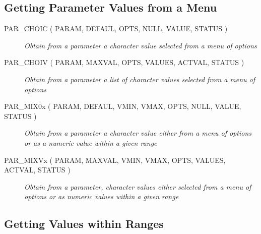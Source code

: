 \documentclass[twoside,11pt]{article}
\newcommand{\htmlref}[2]{#1}
\newcommand{\xlabel}[1]{}
\newcommand{\listline}{\hspace{1pt}\\}
\newcommand{\listova}[1]{}
\newcommand{\listovb}[1]{\textbf{#1}\\}
\renewcommand{\listline}{}
\renewcommand{\listova}[1]{#1}
\renewcommand{\listovb}[1]{}
\begin{document}
\subsection{\xlabel{getting_parameter_values_from_a_menu}Getting Parameter Values from a Menu}

\begin{description}
\item [\htmlref{PAR\_CHOIC}{PAR_CHOIC} 
( PARAM, DEFAUL, OPTS, NULL, VALUE, STATUS )] \listline
\textit{Obtain from a parameter a character value selected from a menu
            of options}
\item [\htmlref{PAR\_CHOIV}{PAR_CHOIV} 
( PARAM, MAXVAL, OPTS, VALUES, ACTVAL, STATUS )] \listline
\textit{Obtain from a parameter a list of character values selected from
            a menu of options}
\item [\htmlref{PAR\_MIX0x}{PAR_MIX0x} 
( PARAM, DEFAUL, VMIN, VMAX, OPTS, NULL, VALUE, STATUS )] \listline
\textit{Obtain from a parameter a character value either from a menu of
             options or as a numeric value within a given range}
\item [\htmlref{PAR\_MIXVx}{PAR_MIXVx} 
( PARAM, MAXVAL, VMIN, VMAX, OPTS, VALUES, ACTVAL, \listova{STATUS )}] \listline
\listovb{STATUS )}
\textit{Obtain from a parameter, character values either selected from a
             menu of options or as numeric values within a given range}
\end{description}

\subsection{\xlabel{getting_values_within_ranges}Getting Values within Ranges}
\end{document}
